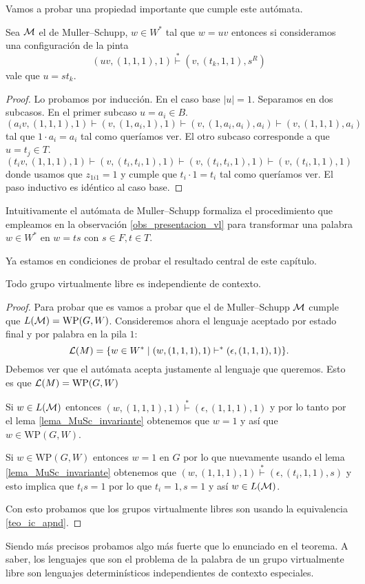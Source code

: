 \documentclass[tesis.tex]{subfiles}
\begin{document}
	Vamos a probar una propiedad importante que cumple este autómata.
	\begin{lema}\label{lema_MuSc_invariante}
	Sea $\cal M$ el \APD de Muller--Schupp, $w \in W^*$ tal que $ w = uv $ entonces si consideramos una configuración de la pinta
		\[
			(uv,(1,1,1), 1) \overset{*}{\vdash} (v, (t_{k},1,1), s^R)
		\]
		vale que $u = st_{k}$.
	\end{lema}
	
	\begin{proof}
		Lo probamos por inducción.
		En el caso base $|u| = 1$.
		Separamos en dos subcasos. 
		En el primer subcaso $u = a_{i} \in B$.
		\[
		(a_{i}v, ( 1,1,1), 1 ) \vdash (v, (1,a_{i},1),1) \vdash (v,(1,a_{i},a_{i}),a_{i}) \vdash (v, (1,1,1), a_{i})
		\]
		tal que $1 \cdot a_{i} = a_{i}$ tal como queríamos ver.
		El otro subcaso corresponde a que $u = t_{j} \in T$.
		\[
		(t_{i}v, (1,1,1), 1) \vdash (v, (t_{i},t_{i},1),1) \vdash (v,(t_{i},t_{i},1),1) \vdash (v, (t_{i},1,1), 1)
		\]
		donde usamos que $z_{1i1} = 1$ y cumple que $t_{i} \cdot 1 = t_{i}$ tal como queríamos ver.
		El paso inductivo es idéntico al caso base.
	\end{proof}
	
	
	Intuitivamente el autómata de Muller--Schupp formaliza el procedimiento que empleamos en la observación \ref{obs_presentacion_vl} para transformar una palabra $w \in W^*$ en $w = ts$ con $s \in F, t \in T$.
	
	Ya estamos en condiciones de probar el resultado central de este capítulo.

\begin{teo}\label{teo_Muller_Schupp}\cite{muller1983groups}
	Todo grupo virtualmente libre es independiente de contexto.
\end{teo}

\begin{proof}
	Para probar que es \ic vamos a probar que el \APD de Muller--Schupp $\cal M$ cumple que $L({\cal M})= \text{WP}(G,W)$.
	Consideremos ahora el lenguaje aceptado por estado final y por palabra en la pila $1$:
	\[
	{\cal L }(M) = \{  w \in W^* \mid (w,(1,1,1),1)   \vdash^*  (\epsilon, (1,1,1), 1)  \}.
	\]
	Debemos ver que el autómata acepta justamente al lenguaje que queremos. 
	Esto es que $ {\cal L }(M) = \text{WP}(G,W) $ 
	
	Si $w \in L(\cal M)$ entonces $(w, (1,1,1), 1) \overset{*}{\vdash} (\epsilon, (1,1,1), 1)$ y por lo tanto por el lema \ref{lema_MuSc_invariante} obtenemos que $w = 1$ y así que $w \in \text{WP}(G,W)$.
	
	Si $w \in \text{WP}(G,W)$ entonces $w = 1$ en $G$ por lo que nuevamente usando el lema \ref{lema_MuSc_invariante} obtenemos que $(w, (1,1,1), 1) \overset{*}{\vdash} (\epsilon, (t_{i},1,1), s)$
	y esto implica que $t_{i}s = 1$ por lo que $t_{i} = 1, s =1$ y así $w \in L(\cal M)$.
	
	
	Con esto probamos que los grupos virtualmente libres son \ic usando la equivalencia \ref{teo_ic_apnd}.
	
\end{proof}

Siendo más precisos probamos algo más fuerte que lo enunciado en el teorema.
A saber, los lenguajes que son el problema de la palabra de un grupo virtualmente libre son lenguajes determinísticos independientes de contexto especiales.
\end{document}
